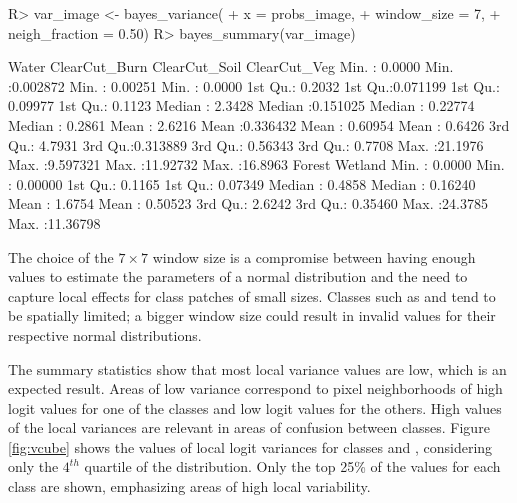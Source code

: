 \documentclass[
  shortnames]{jss}
\begin{document}
\begin{CodeChunk}
\begin{CodeInput}
R> var_image <- bayes_variance(
+     x = probs_image,
+     window_size = 7,
+     neigh_fraction = 0.50)
R> bayes_summary(var_image)
\end{CodeInput}
\begin{CodeOutput}
 Water             ClearCut_Burn      ClearCut_Soil      ClearCut_Veg     
 Min.   : 0.0000   Min.   :0.002872   Min.   : 0.00251   Min.   : 0.0000  
 1st Qu.: 0.2032   1st Qu.:0.071199   1st Qu.: 0.09977   1st Qu.: 0.1123  
 Median : 2.3428   Median :0.151025   Median : 0.22774   Median : 0.2861  
 Mean   : 2.6216   Mean   :0.336432   Mean   : 0.60954   Mean   : 0.6426  
 3rd Qu.: 4.7931   3rd Qu.:0.313889   3rd Qu.: 0.56343   3rd Qu.: 0.7708  
 Max.   :21.1976   Max.   :9.597321   Max.   :11.92732   Max.   :16.8963  
 Forest            Wetland           
 Min.   : 0.0000   Min.   : 0.00000  
 1st Qu.: 0.1165   1st Qu.: 0.07349  
 Median : 0.4858   Median : 0.16240  
 Mean   : 1.6754   Mean   : 0.50523  
 3rd Qu.: 2.6242   3rd Qu.: 0.35460  
 Max.   :24.3785   Max.   :11.36798  
\end{CodeOutput}
\end{CodeChunk}

The choice of the \(7 \times 7\) window size is a compromise between having enough values to estimate the parameters of a normal distribution and the need to capture local effects for class patches of small sizes. Classes such as  and  tend to be spatially limited; a bigger window size could result in invalid values for their respective normal distributions.

The summary statistics show that most local variance values are low, which is an expected result. Areas of low variance correspond to pixel neighborhoods of high logit values for one of the classes and low logit values for the others. High values of the local variances are relevant in areas of confusion between classes. Figure \ref{fig:vcube} shows the values of local logit variances for classes  and , considering only the \(4^{th}\) quartile of the distribution. Only the top 25\% of the values for each class are shown, emphasizing areas of high local variability.
\end{document}
